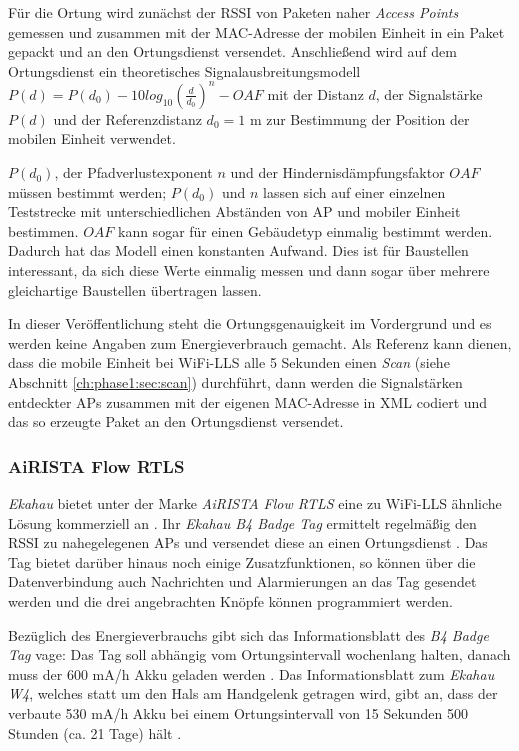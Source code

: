 Für die Ortung wird zunächst der RSSI von Paketen naher \emph{Access Points} gemessen und zusammen mit der MAC-Adresse der mobilen Einheit in ein Paket gepackt und an den Ortungsdienst versendet.
Anschließend wird auf dem Ortungsdienst ein theoretisches Signalausbreitungsmodell $P(d) = P(d_0) - 10log_{10}(\frac{d}{d_0})^n - OAF$ mit der Distanz $d$, der Signalstärke $P(d)$ und der Referenzdistanz $d_0 = 1$ m zur Bestimmung der Position der mobilen Einheit verwendet. 

$P(d_0)$, der Pfadverlustexponent $n$ und der Hindernisdämpfungsfaktor $OAF$ müssen bestimmt werden; $P(d_0)$ und $n$ lassen sich auf einer einzelnen Teststrecke mit unterschiedlichen Abständen von AP und mobiler Einheit bestimmen. $OAF$ kann sogar für einen Gebäudetyp einmalig bestimmt werden.
Dadurch hat das Modell einen konstanten Aufwand. 
Dies ist für Baustellen interessant, da sich diese Werte einmalig messen und dann sogar über mehrere gleichartige Baustellen übertragen lassen.

In dieser Veröffentlichung steht die Ortungsgenauigkeit im Vordergrund und es werden keine Angaben zum Energieverbrauch gemacht. 
Als Referenz kann dienen, dass die mobile Einheit bei WiFi-LLS alle 5 Sekunden einen \emph{Scan} (siehe Abschnitt \ref{ch:phase1:sec:scan}) durchführt, dann werden die Signalstärken entdeckter APs zusammen mit der eigenen MAC-Adresse in XML codiert und das so erzeugte Paket an den Ortungsdienst versendet.

\subsubsection{AiRISTA Flow RTLS}
\emph{Ekahau} bietet unter der Marke \textit{AiRISTA Flow RTLS} eine zu WiFi-LLS ähnliche Lösung kommerziell an \cite{airista2017airista}.
Ihr \emph{Ekahau B4 Badge Tag} ermittelt regelmäßig den RSSI zu nahegelegenen APs und versendet diese an einen Ortungsdienst \cite{liu2007survey}.
Das Tag bietet darüber hinaus noch einige Zusatzfunktionen, so können über die Datenverbindung auch Nachrichten und Alarmierungen an das Tag gesendet werden und die drei angebrachten Knöpfe können programmiert werden.

Bezüglich des Energieverbrauchs gibt sich das Informationsblatt des \emph{B4 Badge Tag} vage: Das Tag soll abhängig vom Ortungsintervall wochenlang halten, danach muss der 600 mA/h Akku geladen werden \cite{ekahau2017b4}.
Das Informationsblatt zum \emph{Ekahau W4}, welches statt um den Hals am Handgelenk getragen wird, gibt an, dass der verbaute 530 mA/h Akku bei einem Ortungsintervall von 15 Sekunden 500 Stunden (ca. 21 Tage) hält \cite{ekahau2017w4}.

